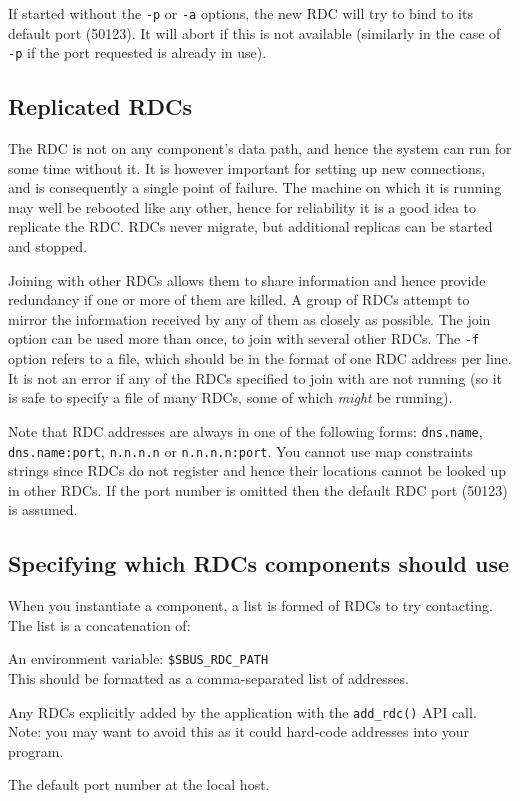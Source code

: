\documentclass[12pt,a4paper,twoside]{article}
\renewcommand{\_}{\texttt{\symbol{95}}}
\begin{document}
If started without the \verb^-p^ or \verb^-a^ options, the new RDC
will try to bind to its default port (50123). It will abort if this
is not available (similarly in the case of \verb^-p^ if the port
requested is already in use).

\subsection{Replicated RDCs}

The RDC is not on any component's data path, and hence the system can
run for some time without it. It is however important for setting up
new connections, and is consequently a single point of failure. The
machine on which it is running may well be rebooted like any other, hence
for reliability it is a good idea to replicate the RDC.
RDCs never migrate, but additional replicas can be started and stopped.

Joining with other RDCs allows them to share information and
hence provide redundancy if one or more of them are killed.
A group of RDCs attempt to mirror the information received by any of
them as closely as possible.
The join option can be used more than once, to join with several
other RDCs.
The \verb^-f^ option refers to
a file, which should be in the format of one RDC address per line.
It is not an error if any of the RDCs specified
to join with are not running
(so it is safe to specify a file of many RDCs, some of which \textit{might}
be running).

Note that RDC addresses are always in one of the following forms:
\verb^dns.name^, \verb^dns.name:port^, \verb^n.n.n.n^
or \verb^n.n.n.n:port^. You cannot
use map constraints strings since RDCs do not register and hence
their locations cannot be looked up in other RDCs. If the port
number is omitted then the default RDC port (50123) is assumed.

\subsection{Specifying which RDCs components should use}

When you instantiate a component, a list is formed of RDCs
to try contacting. The list is a concatenation of:
\begin{bulletlist}
\item An environment variable: \verb^$SBUS_RDC_PATH^\\
      This should be formatted as a comma-separated list of addresses.
\item Any RDCs explicitly added by the application with the
      \verb^add_rdc()^ API call.\\
		Note: you may want to avoid this as it could hard-code addresses
		into your program.
\item The default port number at the local host.
\end{bulletlist}
\end{document}
